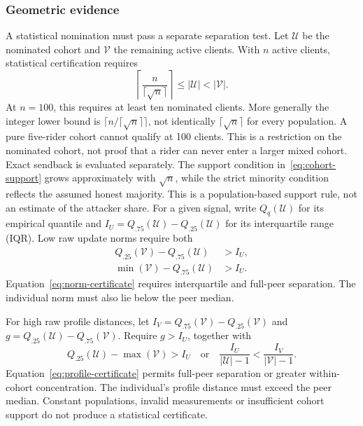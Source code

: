 \documentclass[journal]{IEEEtran}
\begin{document}
\subsubsection{Geometric evidence}
A statistical nomination must pass a separate separation test. Let
$\mathcal U$ be the nominated cohort and $\mathcal V$ the remaining active
clients. With $n$ active clients, statistical certification requires
\begin{equation}\label{eq:cohort-support}
 \left\lceil\frac{n}{\lceil\sqrt n\rceil}\right\rceil
       \leq|\mathcal U|<|\mathcal V|.
\end{equation}
At $n=100$, this requires at least ten nominated clients. More generally
the integer lower bound is $\lceil n/\lceil\sqrt n\rceil\rceil$, not
identically $\lceil\sqrt n\rceil$ for every population. A pure five-rider
cohort cannot qualify at 100 clients. This is a restriction on the nominated
cohort, not proof that a rider can never enter a larger mixed cohort.
Exact sendback is evaluated separately.
The support condition in~\eqref{eq:cohort-support} grows approximately with $\sqrt n$, while the strict
minority condition reflects the assumed honest majority. This is a
population-based support rule, not an estimate of the attacker share.
For a given signal, write $Q_q(\mathcal U)$ for its empirical quantile
and $I_U=Q_{.75}(\mathcal U)-Q_{.25}(\mathcal U)$ for its interquartile
range (IQR). Low raw update norms require both
\begin{align}\label{eq:norm-certificate}
 Q_{.25}(\mathcal V)-Q_{.75}(\mathcal U)&>I_U,\\
 \min(\mathcal V)-Q_{.75}(\mathcal U)&>I_U.\nonumber
\end{align}
Equation~\eqref{eq:norm-certificate} requires interquartile and full-peer separation. The individual norm must also lie below the peer median.

For high raw profile distances, let
$I_V=Q_{.75}(\mathcal V)-Q_{.25}(\mathcal V)$ and
$g=Q_{.25}(\mathcal U)-Q_{.75}(\mathcal V)$. Require $g>I_U$,
together with
\begin{equation}\label{eq:profile-certificate}
 Q_{.25}(\mathcal U)-\max(\mathcal V)>I_U
 \quad\text{or}\quad
 \frac{I_U}{|\mathcal U|-1}<\frac{I_V}{|\mathcal V|-1}.
\end{equation}
Equation~\eqref{eq:profile-certificate} permits full-peer separation or greater within-cohort concentration. The individual's profile distance must exceed the peer median. Constant
populations, invalid measurements or insufficient cohort support do not
produce a statistical certificate.
\end{document}
